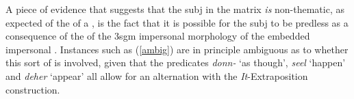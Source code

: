 \documentclass[output=paper]{LSP/langsci}
\begin{document}



A piece of evidence that suggests that the {\sc subj} in the matrix \emph{is} non-thematic, as expected of the  of a , is the fact that it is possible for the {\sc subj} to be {\sc pred}less as a consequence of the  of the {\sc 3sgm} impersonal morphology of the embedded impersonal . %
Instances such as (\ref{ambig}) are 
in principle ambiguous as to whether 
this sort of  %
is involved, given that the  predicates \emph{donn-} `as though', \emph{se\textcrh el} `happen' and \emph{deher} `appear' all allow for an alternation with the \emph{It}-Extraposition construction.
\end{document}
